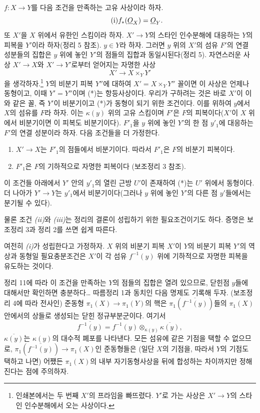 $f:X\longrightarrow Y$를 다음 조건을 만족하는 고유 사상이라 하자.
\begin{equation}
  \tag{i}
  f_*(\underline{O}_X)=\underline{O}_Y.
\end{equation}
또 $X'$을 $X$ 위에서 유한인 스킴이라 하자. $X'\longrightarrow Y$의
스타인 인수분해에 대응하는 $Y$의 피복을 $Y'$이라 하자(정리 5 참조).
$y\in Y$라 하자. 그러면 $y$ 위의 $X'$의 섬유 $F'$의 연결 성분들의
집합은 $y$ 위에 놓인 $Y'$의 점들의 집합과 동일시된다(정리 5). 자연스러운
사상 $X'\longrightarrow X$와
$X'\longrightarrow Y'$로부터 얻어지는 자명한 사상
\begin{equation}
  \tag{*}
  X'\longrightarrow X\times_Y Y'
\end{equation}
을 생각하자.\footnote{인쇄본에서는 두 번째 $X'$의 프라임을 빠뜨렸다.
$Y'$로 가는 사상은 $X'\to Y$의 스타인 인수분해에서 오는 사상이다.}
$Y$의 비분기 피복 $Y''$에 대하여 $X'=X\times_Y Y''$ 꼴이면 이 사상은
언제나 동형이고, 이때 $Y'=Y''$이며 (*)는 항등사상이다. 우리가 구하려는
것은 바로 $X'$이 이와 같은 꼴, 즉 $Y'$이 비분기이고 (*)가 동형이 되기
위한 조건이다. 이를 위하여 $y$에서 $X$의 섬유를 $F$라 하자. 이는
$\kappa(y)$ 위의 고유 스킴이며 $F'$은 $F$의 피복이다($X'$이 $X$ 위에서
비분기이면 이 피복도 비분기이다). $F'_1$을 $y$ 위에 놓인 $Y'$의 한 점
$y'_1$에 대응하는 $F'$의 연결 성분이라 하자. 다음 조건들을 더 가정한다.
\begin{enumerate}
  \item[\textit{(ii)}] $X'\longrightarrow X$는 $F'_1$의 점들에서
    비분기이다. 따라서 $F'_1$은 $F$의 비분기 피복이다.
  \item[\textit{(iii)}] $F'_1$은 $F$의 기하적으로 자명한 피복이다
    (보조정리 3 참조).
\end{enumerate}

 이 조건들 아래에서 $Y'$ 안의 $y'_1$의 열린 근방
$U'$이 존재하여 (*)는 $U'$ 위에서 동형이다. 더 나아가
$Y'\longrightarrow Y$는 $y'_1$에서 비분기이다(그러나 $y$ 위에 놓인
$Y'$의 다른 점 $y'$들에서는 분기될 수 있다).

물론 조건 \textit{(ii)}와 \textit{(iii)}는 정리의 결론이 성립하기
위한 필요조건이기도 하다. 증명은 보조정리 3과 정리 2를 쓰면 쉽게 따른다.

 여전히 \textit{(i)}가 성립한다고 가정하자. $X$ 위의
비분기 피복 $X'$이 $Y$의 비분기 피복 $Y'$의 역상과 동형일 필요충분조건은
$X'$이 각 섬유 $f^{-1}(y)$ 위에 기하적으로 자명한 피복을 유도하는 것이다.

정리 11에 따라 이 조건을 만족하는 $Y$의 점들의 집합은 열려 있으므로,
닫힌점 $y$들에 대해서만 확인하면 충분하다\ldots{} 따름정리 1과 동치인
다음 명제도 기록해 두자. (보조정리 4에 따라 전사인) 준동형
$\pi_1(X)\longrightarrow\pi_1(Y)$의 핵은
$\pi_1(\overline{f^{-1}(y)})$들의 $\pi_1(X)$ 안에서의 상들로 생성되는
닫힌 정규부분군이다. 여기서
\[
  \overline{f^{-1}(y)}
  =f^{-1}(y)\otimes_{\kappa(y)}\overline{\kappa(y)},
\]
$\overline{\kappa(y)}$는 $\kappa(y)$의 대수적 폐포를 나타낸다. 모든
섬유에 같은 기점을 택할 수 없으므로,
$\pi_1(\overline{f^{-1}(y)})\longrightarrow\pi_1(X)$인 준동형들은
(일단 $X$의 기점을, 따라서 $Y$의 기점도 택하고 나면) 어쨌든
$\pi_1(X)$의 내부 자기동형사상을 뒤에 합성하는 차이까지만 정해진다는
점에 주의하자.

